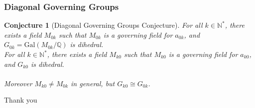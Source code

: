 \documentclass[12pt]{beamer}
\newtheorem*{conjecture}{Conjecture}
\begin{document}
	\begin{frame}
		\frametitle{Diagonal Governing Groups}
		\begin{conjecture}[Diagonal Governing Groups Conjecture]
			For all $k \in \mathbb{N}^*$, there exists a field $M_{0k}$ such that $M_{0k}$ is a governing field for $a_{0k}$, and $G_{0k} = \text{Gal}(M_{0k}/\mathbb{Q})$ is dihedral.\\
			For all $k \in \mathbb{N}^*$, there exists a field $M_{k0}$ such that $M_{k0}$ is a governing field for $a_{k0}$, and $G_{k0}$ is dihedral.\\
			\ \\
			Moreover $M_{k0} \neq M_{0k}$ in general, but $G_{k0} \cong G_{0k}$.
		\end{conjecture}
	\end{frame}

	\begin{frame}[plain]
		\begin{center}
			{\Large \color{std} Thank you}
		\end{center}
	\end{frame}

	
\end{document}
